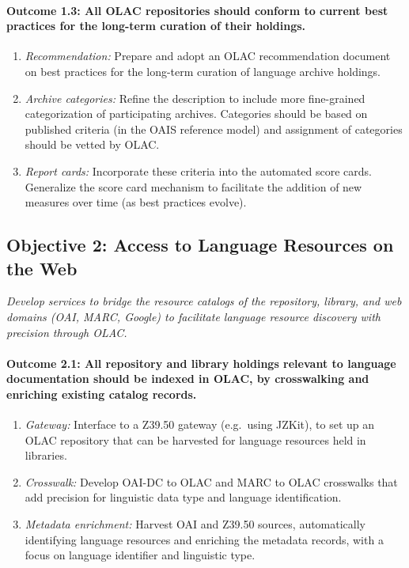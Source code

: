 \def\task{1.3}
\paragraph{Outcome {\task}: All OLAC repositories should conform to current best practices
      for the long-term curation of their holdings.}

\begin{enumerate}[label=\emph{\task\alph*}]
\item \emph{Recommendation:}
  Prepare and adopt an OLAC recommendation document on 
  best practices for the long-term curation of language archive holdings.
\item \emph{Archive categories:}
  Refine the {\tt <olac-archive>} description to include
  more fine-grained categorization of participating archives.
  Categories should be based on published criteria (in the OAIS reference model)
  and assignment of categories should be vetted by OLAC.
\item \emph{Report cards:}
  Incorporate these criteria into the automated score cards.
  Generalize the score card mechanism to facilitate the addition
  of new measures over time (as best practices evolve).
\end{enumerate}

\subsection*{Objective 2: Access to Language Resources on the Web}

\emph{Develop services to bridge the resource catalogs of the
  repository, library, and web domains (OAI, MARC, Google)
  to facilitate language resource discovery with precision through OLAC.}

\def\task{2.1}
\paragraph{Outcome {\task}:  All repository and library holdings relevant to language
   documentation should be indexed in OLAC, by
   crosswalking and enriching existing catalog records.}

\begin{enumerate}[label=\emph{\task\alph*}]
\item \emph{Gateway:}
  Interface to a Z39.50 gateway (e.g.~using JZKit), to set up an
  OLAC repository that can be harvested for language resources held in
  libraries.
\item \emph{Crosswalk:}
  Develop OAI-DC to OLAC and MARC to OLAC crosswalks that add
  precision for linguistic data type and language identification.
\item \emph{Metadata enrichment:}
  Harvest OAI and Z39.50 sources, automatically identifying language resources
  and enriching the metadata records, with a focus on language
  identifier and linguistic type.
\end{enumerate}

